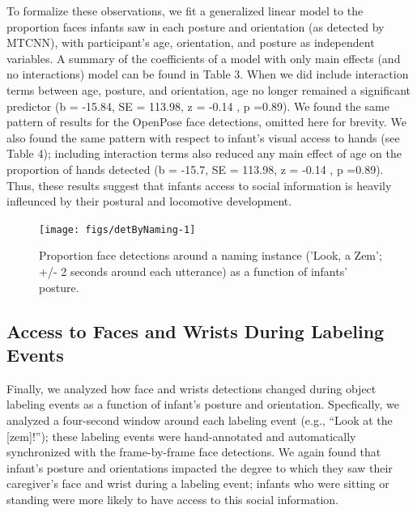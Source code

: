 \documentclass[10pt, letterpaper]{article}
\newenvironment{CodeChunk}{}{}
\begin{document}
To formalize these observations, we fit a generalized linear model to
the proportion faces infants saw in each posture and orientation (as
detected by MTCNN), with participant's age, orientation, and posture as
independent variables. A summary of the coefficients of a model with
only main effects (and no interactions) model can be found in Table 3.
When we did include interaction terms between age, posture, and
orientation, age no longer remained a significant predictor (b = -15.84,
SE = 113.98, z = -0.14 , p =0.89). We found the same pattern of results
for the OpenPose face detections, omitted here for brevity. We also
found the same pattern with respect to infant's visual access to hands
(see Table 4); including interaction terms also reduced any main effect
of age on the proportion of hands detected (b = -15.7, SE = 113.98, z =
-0.14 , p =0.89). Thus, these results suggest that infants access to
social information is heavily infleunced by their postural and
locomotive development.

\begin{CodeChunk}
\begin{figure}[H]

{\centering \texttt{[image: figs/detByNaming-1]} 

}

\caption[Proportion face detections around a naming instance ('Look, a Zem']{Proportion face detections around a naming instance ('Look, a Zem'; +/- 2 seconds around each utterance) as a function of infants' posture.}\label{fig:detByNaming}
\end{figure}
\end{CodeChunk}

\subsection{Access to Faces and Wrists During Labeling
Events}\label{access-to-faces-and-wrists-during-labeling-events}

Finally, we analyzed how face and wrists detections changed during
object labeling events as a function of infant's posture and
orientation. Specfically, we analyzed a four-second window around each
labeling event (e.g., ``Look at the {[}zem{]}!''); these labeling events
were hand-annotated and automatically synchronized with the
frame-by-frame face detections. We again found that infant's posture and
orientations impacted the degree to which they saw their caregiver's
face and wrist during a labeling event; infants who were sitting or
standing were more likely to have access to this social information.
\end{document}
